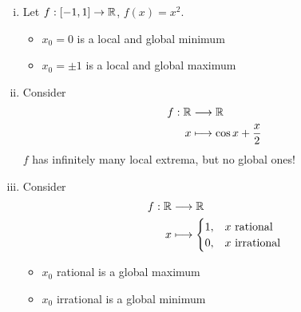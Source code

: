\documentclass[../../script.tex]{subfiles}
\begin{document}
\begin{eg}
    \begin{enumerate}[(i)]
        \item Let $f: [-1, 1] \rightarrow \mathbb{R}$, $f(x) = x^2$. 
        \begin{itemize}
            \item $x_0 = 0$ is a local and global minimum 
            \item $x_0 = \pm 1$ is a local and global maximum
        \end{itemize}

        \item Consider 
        \begin{align*}
            f: \mathbb{R} &\longrightarrow \mathbb{R} \\
            x &\longmapsto \cos x + \frac{x}{2}
        \end{align*}
        $f$ has infinitely many local extrema, but no global ones!

        \begin{center}
        \end{center}

        \item Consider 
        \begin{align*}
            f: \mathbb{R} &\longrightarrow \mathbb{R} \\
            x &\longmapsto \begin{cases}
                1, & x \text{ rational} \\
                0, & x \text{ irrational}
            \end{cases}
        \end{align*}
        \begin{itemize}
            \item $x_0$ rational is a global maximum
            \item $x_0$ irrational is a global minimum
        \end{itemize}
    \end{enumerate}
\end{eg}
\end{document}
